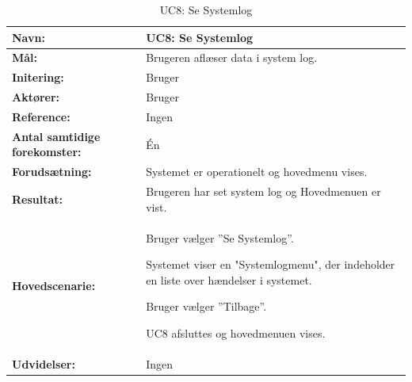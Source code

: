 \begin{table}[h]
\begin{tabularx}{\textwidth}{| >{\raggedright\arraybackslash}p{3.3 cm} | >{\raggedright\arraybackslash}X |} \hline

\textbf{Navn:} 						& UC8: Se Systemlog\\ \hline
\textbf{Mål:}						& Brugeren aflæser data i system log. \\ \hline
\textbf{Initering:}					& Bruger \\ \hline
\textbf{Aktører:} 					& Bruger \\ \hline
\textbf{Reference:} 				& Ingen \\ \hline
\textbf{Antal samtidige forekomster:} & Én \\ \hline
\textbf{Forudsætning:} 				& Systemet er operationelt og hovedmenu vises. \\ \hline
\textbf{Resultat:}					& Brugeren har set system log og Hovedmenuen er vist. \\ \hline
\textbf{Hovedscenarie:}				& 

\begin{packed_enum}
\item Bruger vælger ”Se Systemlog”.
\item Systemet viser en "Systemlogmenu", der indeholder en liste over hændelser i systemet.
\item Bruger vælger ”Tilbage”.
\item UC8 afsluttes og hovedmenuen vises. 
\end{packed_enum} \\ \hline
\textbf{Udvidelser:}				&  
Ingen
\\ \hline
\end{tabularx}
\caption{UC8: Se Systemlog}
\label{tbl:UC8}
\end{table}



